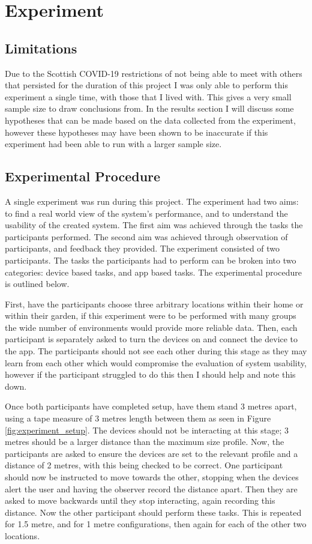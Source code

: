 \documentclass{l4proj}
\begin{document}
\section{Experiment}

\subsection{Limitations}

Due to the Scottish COVID-19 restrictions of not being able to meet with others that persisted for the duration of this project I was only able to perform this experiment a single time, with those that I lived with. This gives a very small sample size to draw conclusions from. In the results section I will discuss some hypotheses that can be made based on the data collected from the experiment, however these hypotheses may have been shown to be inaccurate if this experiment had been able to run with a larger sample size.

\subsection{Experimental Procedure}

A single experiment was run during this project. The experiment had two aims: to find a real world view of the system's performance, and to understand the usability of the created system. The first aim was achieved through the tasks the participants performed. The second aim was achieved through observation of participants, and feedback they provided. The experiment consisted of two participants. The tasks the participants had to perform can be broken into two categories: device based tasks, and app based tasks. The experimental procedure is outlined below.

First, have the participants choose three arbitrary locations within their home or within their garden, if this experiment were to be performed with many groups the wide number of environments would provide more reliable data. Then, each participant is separately asked to turn the devices on and connect the device to the app. The participants should not see each other during this stage as they may learn from each other which would compromise the evaluation of system usability, however if the participant struggled to do this then I should help and note this down.

Once both participants have completed setup, have them stand 3 metres apart, using a tape measure of 3 metres length between them as seen in Figure \ref{fig:experiment_setup}. The devices should not be interacting at this stage; 3 metres should be a larger distance than the maximum size profile. Now, the participants are asked to ensure the devices are set to the relevant profile and a distance of 2 metres, with this being checked to be correct. One participant should now be instructed to move towards the other, stopping when the devices alert the user and having the observer record the distance apart. Then they are asked to move backwards until they stop interacting, again recording this distance. Now the other participant should perform these tasks. This is repeated for 1.5 metre, and for 1 metre configurations, then again for each of the other two locations.
\end{document}
